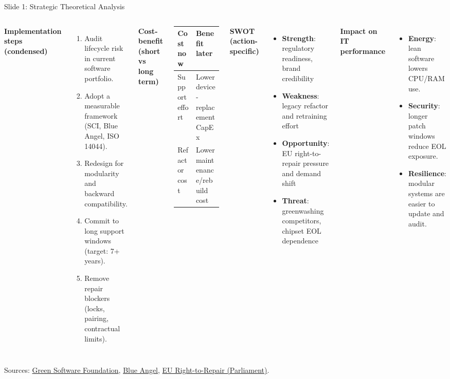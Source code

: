 \documentclass[aspectratio=169]{beamer}
\begin{document}
\begin{frame}{Slide 1: Strategic Theoretical Analysis}
\scriptsize
\begin{columns}[T,totalwidth=\textwidth]
\textbf{Implementation steps (condensed)}
\begin{enumerate}
  \item Audit lifecycle risk in current software portfolio.
  \item Adopt a measurable framework (SCI, Blue Angel, ISO 14044).
  \item Redesign for modularity and backward compatibility.
  \item Commit to long support windows (target: 7+ years).
  \item Remove repair blockers (locks, pairing, contractual limits).
\end{enumerate}

\textbf{Cost-benefit (short vs long term)}
\begin{tabular}{p{1.9cm}p{2.6cm}}
\toprule
Cost now & Benefit later \\
\midrule
Support effort & Lower device-replacement CapEx \\
Refactor cost & Lower maintenance/rebuild cost \\
\bottomrule
\end{tabular}

\textbf{SWOT (action-specific)}
\begin{itemize}
  \item \textbf{Strength}: regulatory readiness, brand credibility
  \item \textbf{Weakness}: legacy refactor and retraining effort
  \item \textbf{Opportunity}: EU right-to-repair pressure and demand shift
  \item \textbf{Threat}: greenwashing competitors, chipset EOL dependence
\end{itemize}

\textbf{Impact on IT performance}
\begin{itemize}
  \item \textbf{Energy}: lean software lowers CPU/RAM use.
  \item \textbf{Security}: longer patch windows reduce EOL exposure.
  \item \textbf{Resilience}: modular systems are easier to update and audit.
\end{itemize}
\end{columns}
\vspace{0.1cm}
\tiny Sources: \href{https://greensoftware.foundation}{Green Software Foundation}, \href{https://www.blauer-engel.de/en}{Blue Angel}, \href{https://www.europarl.europa.eu/news/en/press-room/20240419IPR20590/right-to-repair-rules-adopted}{EU Right-to-Repair (Parliament)}.
\end{frame}
\end{document}
